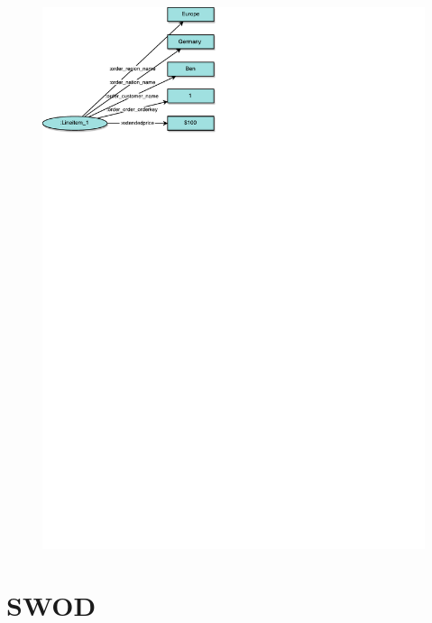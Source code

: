 \begin{frame}{\patsec}
\framesubtitle{\denormpat}
    \begin{figure}
        \includegraphics[trim=0 648 325 0,clip,width=1\textheight]{images/denormalizedpattern.pdf}
    \end{figure}
\end{frame}


\section{SWOD}

